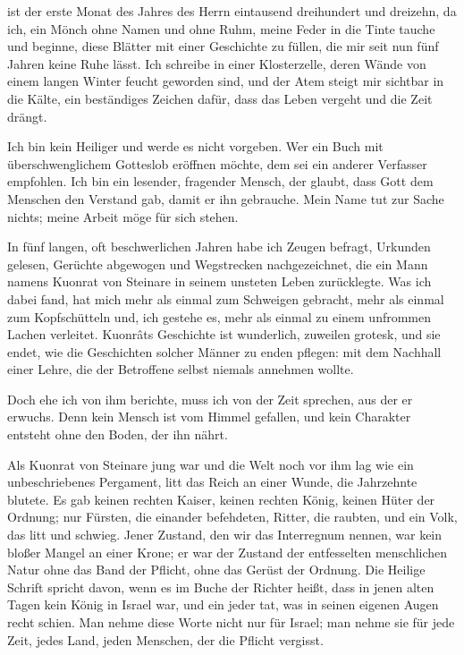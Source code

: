  ist der erste Monat des Jahres des Herrn eintausend dreihundert und dreizehn, da ich, ein Mönch ohne Namen und ohne Ruhm, meine Feder in die Tinte tauche und beginne, diese Blätter mit einer Geschichte zu füllen, die mir seit nun fünf Jahren keine Ruhe lässt. Ich schreibe in einer Klosterzelle, deren Wände von einem langen Winter feucht geworden sind, und der Atem steigt mir sichtbar in die Kälte, ein beständiges Zeichen dafür, dass das Leben vergeht und die Zeit drängt.

Ich bin kein Heiliger und werde es nicht vorgeben. Wer ein Buch mit überschwenglichem Gotteslob eröffnen möchte, dem sei ein anderer Verfasser empfohlen. Ich bin ein lesender, fragender Mensch, der glaubt, dass Gott dem Menschen den Verstand gab, damit er ihn gebrauche. Mein Name tut zur Sache nichts; meine Arbeit möge für sich stehen.

In fünf langen, oft beschwerlichen Jahren habe ich Zeugen befragt, Urkunden gelesen, Gerüchte abgewogen und Wegstrecken nachgezeichnet, die ein Mann namens \gls{Kuonrat von Steinare} in seinem unsteten Leben zurücklegte. Was ich dabei fand, hat mich mehr als einmal zum Schweigen gebracht, mehr als einmal zum Kopfschütteln und, ich gestehe es, mehr als einmal zu einem unfrommen Lachen verleitet. Kuonrâts Geschichte ist wunderlich, zuweilen grotesk, und sie endet, wie die Geschichten solcher Männer zu enden pflegen: mit dem Nachhall einer Lehre, die der Betroffene selbst niemals annehmen wollte.

Doch ehe ich von ihm berichte, muss ich von der Zeit sprechen, aus der er erwuchs. Denn kein Mensch ist vom Himmel gefallen, und kein Charakter entsteht ohne den Boden, der ihn nährt.

Als \gls{Kuonrat von Steinare} jung war und die Welt noch vor ihm lag wie ein unbeschriebenes Pergament, litt das Reich an einer Wunde, die Jahrzehnte blutete. Es gab keinen rechten Kaiser, keinen rechten König, keinen Hüter der Ordnung; nur Fürsten, die einander befehdeten, Ritter, die raubten, und ein Volk, das litt und schwieg. Jener Zustand, den wir das \gls{Interregnum} nennen, war kein bloßer Mangel an einer Krone; er war der Zustand der entfesselten menschlichen Natur ohne das Band der Pflicht, ohne das Gerüst der Ordnung. Die Heilige Schrift spricht davon, wenn es im Buche der Richter heißt, dass in jenen alten Tagen kein König in Israel war, und ein jeder tat, was in seinen eigenen Augen recht schien. Man nehme diese Worte nicht nur für Israel; man nehme sie für jede Zeit, jedes Land, jeden Menschen, der die Pflicht vergisst.


